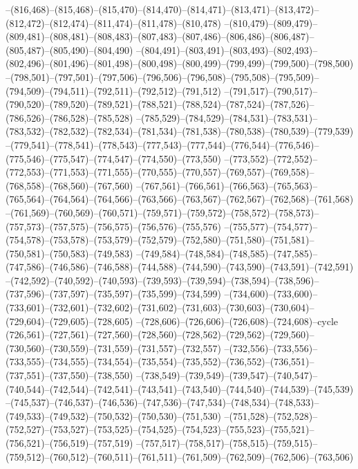 --(816,468)--(815,468)--(815,470)--(814,470)--(814,471)--(813,471)--(813,472)--(812,472)--(812,474)--(811,474)--(811,478)--(810,478)
--(810,479)--(809,479)--(809,481)--(808,481)--(808,483)--(807,483)--(807,486)--(806,486)--(806,487)--(805,487)--(805,490)--(804,490)
--(804,491)--(803,491)--(803,493)--(802,493)--(802,496)--(801,496)--(801,498)--(800,498)--(800,499)--(799,499)--(799,500)--(798,500)
--(798,501)--(797,501)--(797,506)--(796,506)--(796,508)--(795,508)--(795,509)--(794,509)--(794,511)--(792,511)--(792,512)--(791,512)
--(791,517)--(790,517)--(790,520)--(789,520)--(789,521)--(788,521)--(788,524)--(787,524)--(787,526)--(786,526)--(786,528)--(785,528)
--(785,529)--(784,529)--(784,531)--(783,531)--(783,532)--(782,532)--(782,534)--(781,534)--(781,538)--(780,538)--(780,539)--(779,539)
--(779,541)--(778,541)--(778,543)--(777,543)--(777,544)--(776,544)--(776,546)--(775,546)--(775,547)--(774,547)--(774,550)--(773,550)
--(773,552)--(772,552)--(772,553)--(771,553)--(771,555)--(770,555)--(770,557)--(769,557)--(769,558)--(768,558)--(768,560)--(767,560)
--(767,561)--(766,561)--(766,563)--(765,563)--(765,564)--(764,564)--(764,566)--(763,566)--(763,567)--(762,567)--(762,568)--(761,568)
--(761,569)--(760,569)--(760,571)--(759,571)--(759,572)--(758,572)--(758,573)--(757,573)--(757,575)--(756,575)--(756,576)--(755,576)
--(755,577)--(754,577)--(754,578)--(753,578)--(753,579)--(752,579)--(752,580)--(751,580)--(751,581)--(750,581)--(750,583)--(749,583)
--(749,584)--(748,584)--(748,585)--(747,585)--(747,586)--(746,586)--(746,588)--(744,588)--(744,590)--(743,590)--(743,591)--(742,591)
--(742,592)--(740,592)--(740,593)--(739,593)--(739,594)--(738,594)--(738,596)--(737,596)--(737,597)--(735,597)--(735,599)--(734,599)
--(734,600)--(733,600)--(733,601)--(732,601)--(732,602)--(731,602)--(731,603)--(730,603)--(730,604)--(729,604)--(729,605)--(728,605)
--(728,606)--(726,606)--(726,608)--(724,608)--cycle
(726,561)--(727,561)--(727,560)--(728,560)--(728,562)--(729,562)--(729,560)--(730,560)--(730,559)--(731,559)--(731,557)--(732,557)
--(732,556)--(733,556)--(733,555)--(734,555)--(734,554)--(735,554)--(735,552)--(736,552)--(736,551)--(737,551)--(737,550)--(738,550)
--(738,549)--(739,549)--(739,547)--(740,547)--(740,544)--(742,544)--(742,541)--(743,541)--(743,540)--(744,540)--(744,539)--(745,539)
--(745,537)--(746,537)--(746,536)--(747,536)--(747,534)--(748,534)--(748,533)--(749,533)--(749,532)--(750,532)--(750,530)--(751,530)
--(751,528)--(752,528)--(752,527)--(753,527)--(753,525)--(754,525)--(754,523)--(755,523)--(755,521)--(756,521)--(756,519)--(757,519)
--(757,517)--(758,517)--(758,515)--(759,515)--(759,512)--(760,512)--(760,511)--(761,511)--(761,509)--(762,509)--(762,506)--(763,506)
